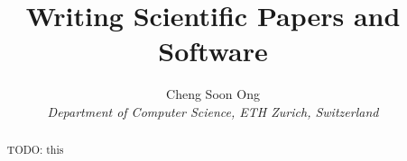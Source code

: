 \documentclass[10pt,conference,compsocconf]{IEEEtran}
\begin{document}
\title{Writing Scientific Papers and Software}

\author{
  Cheng Soon Ong\\
  \textit{Department of Computer Science, ETH Zurich, Switzerland}
}

\maketitle

\begin{abstract}
  TODO: this
\end{abstract}




\newpage


\end{document}
